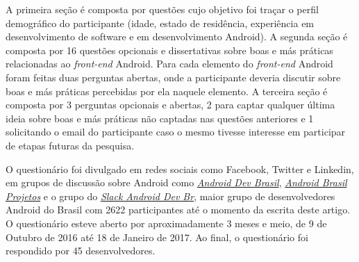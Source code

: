 A primeira seção é composta por questões cujo objetivo foi traçar o perfil demográfico do participante (idade, estado de residência, experiência em desenvolvimento de software e em desenvolvimento Android). A segunda seção é composta por 16 questões opcionais e dissertativas sobre boas e más práticas relacionadas ao \textit{front-end} Android. Para cada elemento do \textit{front-end} Android foram feitas duas perguntas abertas, onde a participante deveria discutir sobre boas e más práticas percebidas por ela naquele elemento. A terceira seção é composta por 3 perguntas opcionais e abertas, 2 para captar qualquer última ideia sobre boas e más práticas não captadas nas questões anteriores e 1 solicitando o email do participante caso o mesmo tivesse interesse em participar de etapas futuras da pesquisa. 







O questionário foi divulgado em redes sociais como Facebook, Twitter e Linkedin, em grupos de discussão sobre Android como \href{https://groups.google.com/forum/#!forum/androidbrasil-dev}{\textit{Android Dev Brasil}}, \href{https://groups.google.com/forum/\#!forum/android-brasil--projetos}{\textit{Android Brasil Projetos}} e o grupo do \href{http://slack.androiddevbr.org/}{\textit{Slack Android Dev Br}}, maior grupo de desenvolvedores Android do Brasil com 2622 participantes até o momento da escrita deste artigo. O questionário esteve aberto por aproximadamente 3 meses e meio, de 9 de Outubro de 2016 até 18 de Janeiro de 2017. Ao final, o questionário foi respondido por 45 desenvolvedores. 

